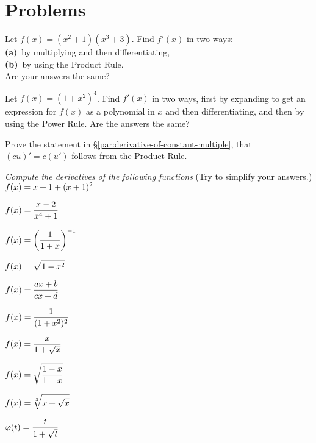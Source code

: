 \section{Problems} 
\problemfont 
\begin{multicols}{2}\setlength{\parindent}{0pt}
\problem Let $f(x)=(x^2+1)(x^3+3)$. Find $f'(x)$ in two ways:\\ 
\textbf{(a)}~by multiplying and then differentiating, \\
\textbf{(b)}~by using the Product Rule.\\
Are your answers the same?


\problem  Let $f(x)=(1+x^2)^4$. Find $f'(x)$ in two ways, first by 
expanding to get an expression for $f(x)$ as a polynomial in $x$ and
then differentiating, and then by using the Power Rule.  Are the
answers the same?

\problem Prove the statement in \S\ref{par:derivative-of-constant-multiple}, that $(cu)' = c(u')$ follows from the Product Rule. 








\noindent \textit{Compute the derivatives of the following functions}
(Try to simplify your answers.)\\




\problem $\displaystyle f(x) = x+1+(x+1)^2$ 




\problem $\displaystyle f(x) = \frac{x-2}{x^4+1}$ 




\problem $\displaystyle f(x) = \left(\frac{1}{1+x}\right)^{-1}$ 




\problem $\displaystyle f(x) = \sqrt{1-x^2}$ 




\problem $\displaystyle f(x) = \frac{ax+b}{cx+d}$ 




\problem $\displaystyle f(x) = \frac1{(1+x^2)^2}$ 




\problem $\displaystyle f(x) = \frac{x}{1+\sqrt x}$ 




\problem $\displaystyle f(x) = \sqrt{\frac{1-x}{1+x}}$ 




\problem $\displaystyle f(x) = \sqrt[3]{x+\sqrt x}$ 




\problem $\displaystyle \varphi(t) = \frac{t}{1+\sqrt t} $ 





\end{multicols}

